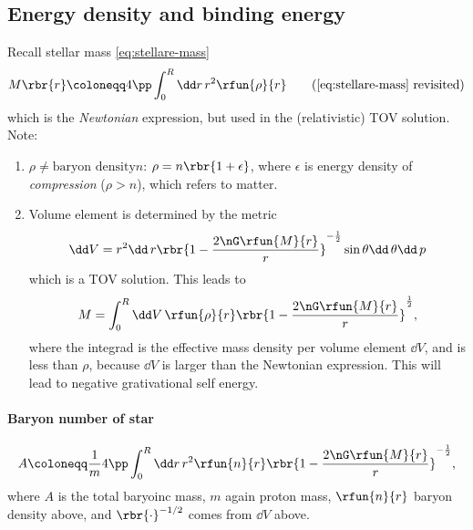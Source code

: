 
\subsection{Energy density and binding energy}
\label{ssec:energy-density}


Recall stellar mass \cref{eq:stellare-mass}
\begin{equation*}
M\rbr{r}\coloneqq 4\pp\int_0^R \dd r\,r^2\rfun{\rho}{r}
\tag{\ref{eq:stellare-mass} revisited}
\end{equation*}
which is the \emph{Newtonian} expression, but used in the (relativistic)
TOV solution. Note:
\begin{enumerate}
\item
\label{it:comp-den}
$\rho \neq \text{baryon density} n$: $\rho = n\rbr{1+\epsilon}$, where
$\epsilon$ is energy density of \emph{compression} ($\rho > n$), which refers
to matter.
\item
Volume element is determined by the metric
\begin{equation}
\dd V = r^2\dd\, r\rbr{1-\frac{2\nG\rfun{M}{r}}{r}}^{-\frac{1}{2}}
\sin \theta \dd\,\theta\dd\, p
\end{equation}
which is a TOV solution. This leads to
\begin{equation}
M = \int_0^R\dd V\,\rfun{\rho}{r}
\rbr{1-\frac{2\nG\rfun{M}{r}}{r}}^\frac{1}{2},
\end{equation}
where the integrad is the effective mass density per volume element $\dd V$,
and is less than $\rho$, because $\dd V$ is larger than the Newtonian
expression. This will lead to negative grativational self energy.
\end{enumerate}

\paragraph{Baryon number of star}
\begin{equation}
A \coloneqq \frac{1}{m} 4\pp\int_0^R\dd r\,r^2\rfun{n}{r}
\rbr{1-\frac{2\nG\rfun{M}{r}}{r}}^{-\frac{1}{2}},
\end{equation}
where $A$ is the total baryoinc mass, $m$ again proton mass, $\rfun{n}{r}$
baryon density above, and $\rbr{\cdot}^{-1/2}$ comes from $\dd V$ above.

